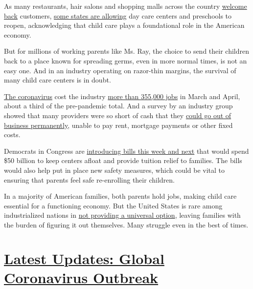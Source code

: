 As many restaurants, hair salons and shopping malls across the country
\href{https://www.nytimes3xbfgragh.onion/interactive/2020/us/states-reopen-map-coronavirus.html}{welcome
back} customers,
\href{http://www.hunt-institute.org/covid-19-resources/}{some states are
allowing} day care centers and preschools to reopen, acknowledging that
child care plays a foundational role in the American economy.

But for millions of working parents like Ms. Ray, the choice to send
their children back to a place known for spreading germs, even in more
normal times, is not an easy one. And in an industry operating on
razor-thin margins, the survival of many child care centers is in doubt.

\href{https://www.nytimes3xbfgragh.onion/news-event/coronavirus}{The
coronavirus} cost the industry
\href{https://www.bls.gov/news.release/empsit.t17.htm}{more than 355,000
jobs} in March and April, about a third of the pre-pandemic total. And a
survey by an industry group showed that many providers were so short of
cash that they
\href{https://www.naeyc.org/sites/default/files/globally-shared/downloads/PDFs/our-work/public-policy-advocacy/effects_of_coronavirus_on_child_care.final.pdf}{could
go out of business permanently}, unable to pay rent, mortgage payments
or other fixed costs.

Democrats in Congress are
\href{https://www.nytimes3xbfgragh.onion/2020/05/27/upshot/virus-childcare-bailout-democrats.html}{introducing
bills this week and next} that would spend \$50 billion to keep centers
afloat and provide tuition relief to families. The bills would also help
put in place new safety measures, which could be vital to ensuring that
parents feel safe re-enrolling their children.

In a majority of American families, both parents hold jobs, making child
care essential for a functioning economy. But the United States is rare
among industrialized nations in
\href{https://www.nytimes3xbfgragh.onion/2019/08/15/upshot/why-americans-resist-child-care.html}{not
providing a universal option}, leaving families with the burden of
figuring it out themselves. Many struggle even in the best of times.

\hypertarget{latest-updates-global-coronavirus-outbreak}{%
\section{\texorpdfstring{\href{https://www.nytimes3xbfgragh.onion/2020/08/04/world/coronavirus-cases.html?action=click\&pgtype=Article\&state=default\&region=MAIN_CONTENT_1\&context=storylines_live_updates}{Latest
Updates: Global Coronavirus
Outbreak}}{Latest Updates: Global Coronavirus Outbreak}}\label{latest-updates-global-coronavirus-outbreak}}

